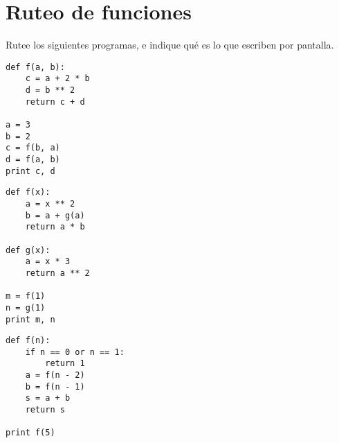 \section{Ruteo de funciones}

Rutee los siguientes programas, e indique qué es lo que escriben por
pantalla.

\begin{lstlisting}
def f(a, b):
    c = a + 2 * b
    d = b ** 2
    return c + d

a = 3
b = 2
c = f(b, a)
d = f(a, b)
print c, d
\end{lstlisting}

\begin{lstlisting}
def f(x):
    a = x ** 2
    b = a + g(a)
    return a * b

def g(x):
    a = x * 3
    return a ** 2

m = f(1)
n = g(1)
print m, n
\end{lstlisting}

\begin{lstlisting}
def f(n):
    if n == 0 or n == 1:
        return 1
    a = f(n - 2)
    b = f(n - 1)
    s = a + b
    return s

print f(5)
\end{lstlisting}

